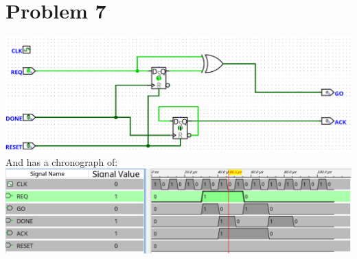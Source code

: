 \documentclass[12pt]{article}
\begin{document}
\section*{Problem 7}
\includegraphics[scale=0.25]{fig14.png}\\
And has a chronograph of:\\
\includegraphics[scale=0.25]{fig15.png}
\end{document}
